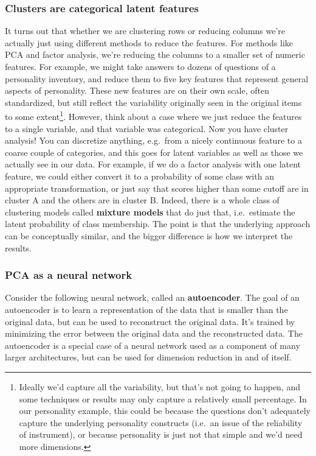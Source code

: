 \documentclass[
  letterpaper,
]{krantz}
\begin{document}
\subsubsection{Clusters are categorical latent
features}\label{clusters-are-categorical-latent-features}

It turns out that whether we are clustering rows or reducing columns
we're actually just using different methods to reduce the features. For
methods like PCA and factor analysis, we're reducing the columns to a
smaller set of numeric features. For example, we might take answers to
dozens of questions of a personality inventory, and reduce them to five
key features that represent general aspects of personality. These new
features are on their own scale, often standardized, but still reflect
the variability originally seen in the original items to some
extent\footnote{Ideally we'd capture all the variability, but that's not
  going to happen, and some techniques or results may only capture a
  relatively small percentage. In our personality example, this could be
  because the questions don't adequately capture the underlying
  personality constructs (i.e.~an issue of the reliability of
  instrument), or because personality is just not that simple and we'd
  need more dimensions.}. However, think about a case where we just
reduce the features to a single variable, and that variable was
categorical. Now you have cluster analysis! You can discretize anything,
e.g.~from a nicely continuous feature to a coarse couple of categories,
and this goes for latent variables as well as those we actually see in
our data. For example, if we do a factor analysis with one latent
feature, we could either convert it to a probability of some class with
an appropriate transformation, or just say that scores higher than some
cutoff are in cluster A and the others are in cluster B. Indeed, there
is a whole class of clustering models called \textbf{mixture models}
that do just that, i.e.~estimate the latent probability of class
membership. The point is that the underlying approach can be
conceptually similar, and the bigger difference is how we interpret the
results.

\subsubsection{PCA as a neural network}\label{pca-as-a-neural-network}

Consider the following neural network, called an \textbf{autoencoder}.
The goal of an autoencoder is to learn a representation of the data that
is smaller than the original data, but can be used to reconstruct the
original data. It's trained by minimizing the error between the original
data and the reconstructed data. The autoencoder is a special case of a
neural network used as a component of many larger architectures, but can
be used for dimension reduction in and of itself.
\end{document}
